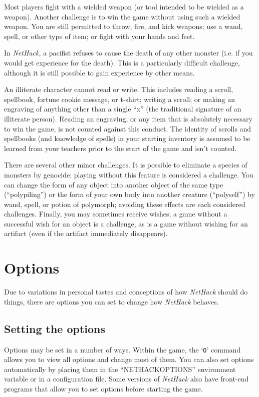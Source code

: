 Most players fight with a wielded weapon (or tool intended to be
wielded as a weapon).  Another challenge is to win the game without
using such a wielded weapon.  You are still permitted to throw,
fire, and kick weapons; use a wand, spell, or other type of item;
or fight with your hands and feet.

In {\it NetHack\/}, a pacifist refuses to cause the death of any other monster
(i.e. if you would get experience for the death).  This is a particularly
difficult challenge, although it is still possible to gain experience
by other means.

An illiterate character cannot read or write.  This includes reading
a scroll, spellbook, fortune cookie message, or t-shirt; writing a
scroll; or making an engraving of anything other than a single ``x'' (the
traditional signature of an illiterate person).  Reading an engraving,
or any item that is absolutely necessary to win the game, is not counted
against this conduct.  The identity of scrolls and spellbooks (and
knowledge of spells) in your starting inventory is assumed to be
learned from your teachers prior to the start of the game and isn't
counted.

There are several other minor challenges.  It is possible to eliminate
a species of monsters by genocide; playing without this feature is
considered a challenge.  You can change the form of any object into
another object of the same type (``polypiling'') or the form of your own
body into another creature (``polyself'') by wand, spell, or potion of
polymorph; avoiding these effects are each considered challenges.
Finally, you may sometimes receive wishes; a game without a successful
wish for an object is a challenge, as is a game without wishing for
an artifact (even if the artifact immediately disappears).

\section{Options}

Due to variations in personal tastes and conceptions of how {\it NetHack\/}
should do things, there are options you can set to change how {\it NetHack\/}
behaves.

\subsection*{Setting the options}

Options may be set in a number of ways.  Within the game, the `{\tt O}'
command allows you to view all options and change most of them.
You can also set options automatically by placing them in the
``NETHACKOPTIONS'' environment variable or in a configuration file.
Some versions of {\it NetHack\/} also have front-end programs that allow
you to set options before starting the game.

